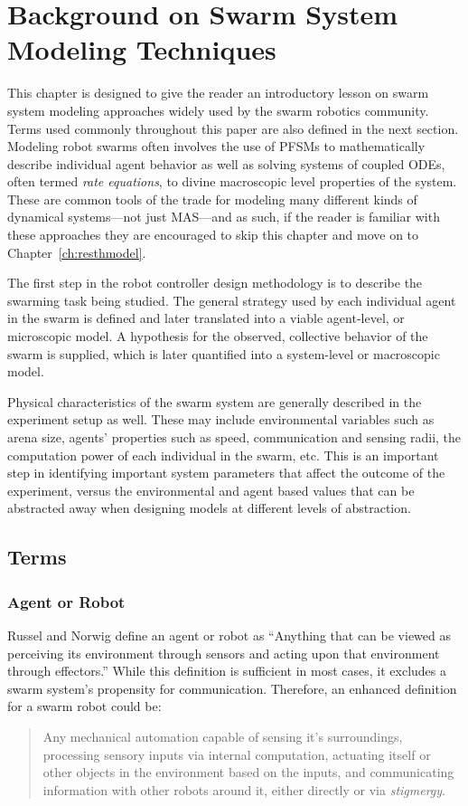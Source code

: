 \documentclass[defaultstyle,12pt]{thesis}
\begin{document}
\chapter{Background on Swarm System Modeling Techniques}\label{ch:background}
This chapter is designed to give the reader an introductory lesson on swarm system modeling approaches widely used by the swarm robotics community. Terms used commonly throughout this paper are also defined in the next section. Modeling robot swarms often involves the use of PFSMs to mathematically describe individual agent behavior as well as solving systems of coupled ODEs, often termed \emph{rate equations}, to divine macroscopic level properties of the system. These are common tools of the trade for modeling many different kinds of dynamical systems---not just MAS---and as such, if the reader is familiar with these approaches they are encouraged to skip this chapter and move on to Chapter~\ref{ch:resthmodel}.

The first step in the robot controller design methodology is to describe the swarming task being studied. The general strategy used by each individual agent in the swarm is defined and later translated into a viable agent-level, or microscopic model. A hypothesis for the observed, collective behavior of the swarm is supplied, which is later quantified into a system-level or macroscopic model.

Physical characteristics of the swarm system are generally described in the experiment setup as well. These may include environmental variables such as arena size, agents' properties such as speed, communication and sensing radii, the computation power of each individual in the swarm, etc. This is an important step in identifying important system parameters that affect the outcome of the experiment, versus the environmental and agent based values that can be abstracted away when designing models at different levels of abstraction.

\section{Terms}
\subsection{Agent or Robot}
Russel and Norwig \cite{Russel1995} define an agent or robot as ``Anything that can be viewed as perceiving its environment through sensors and acting upon that environment through effectors.'' While this definition is sufficient in most cases, it excludes a swarm system's propensity for communication. Therefore, an enhanced definition for a swarm robot could be: 
\begin{quote}
Any mechanical automation capable of sensing it's surroundings, processing sensory inputs via internal computation, actuating itself or other objects in the environment based on the inputs, and communicating information with other robots around it, either directly or via \emph{stigmergy}.
\end{quote}
\end{document}
